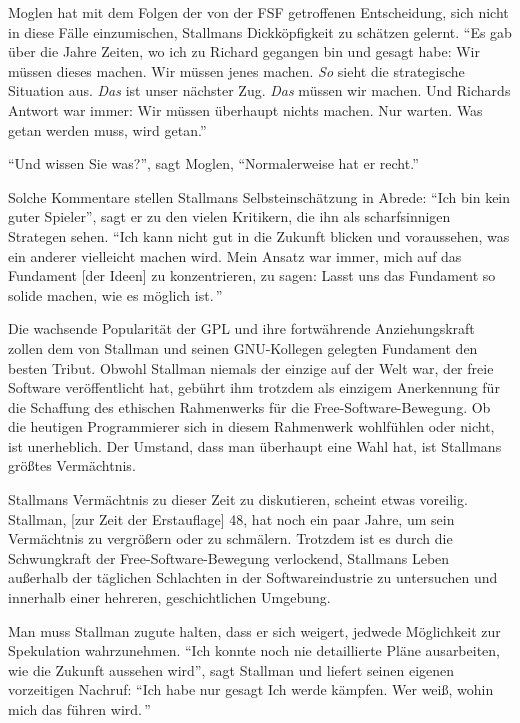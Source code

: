 Moglen hat mit dem Folgen der von der FSF getroffenen Entscheidung, sich nicht in diese Fälle einzumischen, Stallmans Dickköpfigkeit zu schätzen gelernt. "`Es gab über die Jahre Zeiten, wo ich zu Richard gegangen bin und gesagt habe: \glq Wir müssen dieses machen. Wir müssen jenes machen. \textit{So} sieht die strategische Situation aus. \textit{Das} ist unser nächster Zug. \textit{Das} müssen wir machen.\grq{} Und Richards Antwort war immer: \glq Wir müssen überhaupt nichts machen.\grq{} Nur warten. Was getan werden muss, wird getan."'

"`Und wissen Sie was?"', sagt Moglen, "`Normalerweise hat er recht."'

Solche Kommentare stellen Stallmans Selbsteinschätzung in Abrede: "`Ich bin kein guter Spieler"', sagt er zu den vielen Kritikern, die ihn als scharfsinnigen Strategen sehen. "`Ich kann nicht gut in die Zukunft blicken und voraussehen, was ein anderer vielleicht machen wird. Mein Ansatz war immer, mich auf das Fundament [der Ideen] zu konzentrieren, zu sagen: \glq Lasst uns das Fundament so solide machen, wie es möglich ist.\grq\,"'

Die wachsende Popularität der GPL und ihre fortwährende Anziehungskraft zollen dem von Stallman und seinen GNU-Kollegen gelegten Fundament den besten Tribut. Obwohl Stallman niemals der einzige auf der Welt war, der freie Software veröffentlicht hat, gebührt ihm trotzdem als einzigem Anerkennung für die Schaffung des ethischen Rahmenwerks für die Free-Software-Bewegung. Ob die heutigen Programmierer sich in diesem Rahmenwerk wohlfühlen oder nicht, ist unerheblich. Der Umstand, dass man überhaupt eine Wahl hat, ist Stallmans größtes Vermächtnis.

Stallmans Vermächtnis zu dieser Zeit zu diskutieren, scheint etwas voreilig. Stallman, [zur Zeit der Erstauflage] 48, hat noch ein paar Jahre, um sein Vermächtnis zu vergrößern oder zu schmälern. Trotzdem ist es durch die Schwungkraft der Free-Software-Bewegung verlockend, Stallmans Leben außerhalb der täglichen Schlachten in der Softwareindustrie zu untersuchen und innerhalb einer hehreren, geschichtlichen Umgebung.

Man muss Stallman zugute halten, dass er sich weigert, jedwede Möglichkeit zur Spekulation wahrzunehmen. "`Ich konnte noch nie detaillierte Pläne ausarbeiten, wie die Zukunft aussehen wird"', sagt Stallman und liefert seinen eigenen vorzeitigen Nachruf: "`Ich habe nur gesagt \glq Ich werde kämpfen. Wer weiß, wohin mich das führen wird.\grq\,"'


